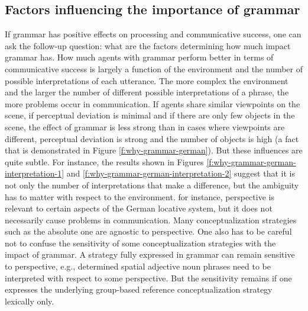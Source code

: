 \subsection{Factors influencing the importance of grammar}
If grammar has positive effects on processing and communicative success, 
one can ask the follow-up question: what are the factors determining
how much impact grammar has. How much agents with 
grammar perform better in terms of communicative success is largely 
a function of the environment and the number of possible 
interpretations of each utterance. The more complex the environment 
and the larger the number of different possible interpretations of a phrase, 
the more problems occur in communication. If agents share similar viewpoints 
on the scene, if perceptual deviation is minimal and if there are only few objects 
in the scene, the effect of grammar is less strong 
than in cases where viewpoints are different, perceptual deviation is strong and the number of objects 
is high (a fact that is demonstrated in Figure \ref{f:why-grammar-german}). 
But these influences are quite subtle. For instance, the results shown in Figures
\ref{f:why-grammar-german-interpretation-1} and \ref{f:why-grammar-german-interpretation-2} suggest that it is not only the number of interpretations that make a difference, but the ambiguity has to matter with respect to the environment. for
instance, perspective is relevant to certain aspects of the German locative system,
but it does not necessarily cause problems in communication. Many conceptualization
strategies such as the absolute one are agnostic to perspective. One
also has to be careful not to confuse the sensitivity of some conceptualization strategies
with the impact of grammar. A strategy fully expressed in grammar can remain 
sensitive to perspective, e.g., determined spatial adjective noun phrases need to be 
interpreted with respect to some perspective. But the sensitivity remains if one expresses the\enlargethispage{1\baselineskip}
underlying group-based reference conceptualization strategy lexically only.

